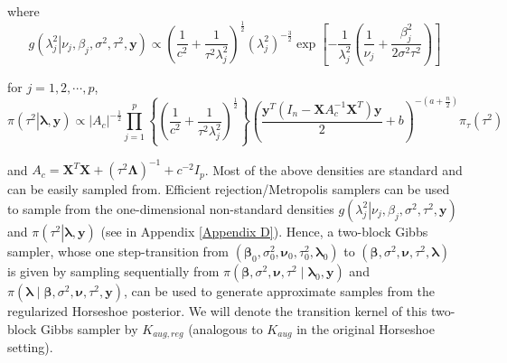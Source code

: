 \documentclass[noinfoline,11pt]{imsart}
\numberwithin{equation}{section}
\theoremstyle{plain}
\newcommand{\y}{\mathbf{y}}
\newcommand{\X}{\mathbf{X}}
\newcommand{\bl}{\boldsymbol{\lambda}}
\newcommand{\Bl}{\boldsymbol{\Lambda}}
\begin{document}
\noindent
where 
$$
g\left(\left.\lambda_j^2\right|\nu_j,\beta_j,\sigma^2,\tau^2,\y\right) \propto \left(\frac{1}{c^2}+\frac{1}{\tau^2\lambda_j^2}\right)^{\frac{1}{2}}\left(\lambda_j^2\right)^{-\frac{3}{2}}\exp{\left[-\frac{1}{\lambda_j^2}\left(\frac{1}{\nu_j}+\frac{\beta_j^2}{2\sigma^2\tau^2}\right)\right]}
$$
   
\noindent
for $j=1,2,\cdots,p$, 
$$
\pi\left(\left.\tau^2\right|\bl,\y\right)\propto\left|A_c\right|^{-\frac{1}{2}}\prod\limits_{j=1}^p\left\{\left(\frac{1}{c^2}+\frac{1}{\tau^2\lambda_j^2}\right)^{\frac{1}{2}}\right\}\left(\frac{\y^T\left(I_n-\X A_c^{-1}\X^T\right)\y}{2}+b\right)^{-\left(a+\frac{n}{2}\right)}\pi_\tau \left(\tau^2\right)
$$

\noindent
and $A_c=\X^T\X+\left(\tau^2\Bl\right)^{-1}+c^{-2}I_p$. Most of the above densities are standard and can be easily sampled from. Efficient rejection/Metropolis samplers can be used to sample from the one-dimensional non-standard densities $g\left(\left.\lambda_j^2\right|\nu_j,\beta_j,\sigma^2,\tau^2,\y\right)$ and $\pi\left(\left.\tau^2\right|\bl,\y\right)$ (see in Appendix \ref{Appendix D}). Hence, a two-block Gibbs sampler, whose one step-transition from $({\boldsymbol \beta}_0, \sigma^2_0, {\boldsymbol \nu}_0, \tau^2_0, {\boldsymbol \lambda}_0)$ to 
$({\boldsymbol \beta}, \sigma^2, {\boldsymbol \nu}, \tau^2, {\boldsymbol \lambda})$ is given by sampling sequentially from $\pi({\boldsymbol \beta}, \sigma^2, {\boldsymbol \nu}, \tau^2 \mid {\boldsymbol \lambda}_0, \y)$ and 
$\pi({\boldsymbol \lambda} \mid {\boldsymbol \beta}, \sigma^2, {\boldsymbol \nu}, \tau^2, \y)$, can be used to generate approximate samples from the regularized Horseshoe posterior. We will denote the transition kernel of this two-block Gibbs sampler by $K_{aug,reg}$ (analogous to $K_{aug}$ in the original Horseshoe setting). 
\end{document}
